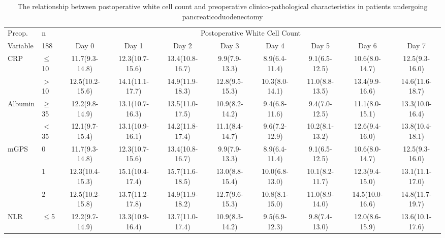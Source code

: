 \begin{sidewaystable}[p]
	\caption{The relationship  between postoperative white cell count and preoperative clinico-pathological characteristics in patients undergoing pancreaticoduodenectomy }
	\label{table:sirs_wcc}
	\footnotesize
	\centering
	\renewcommand{\arraystretch}{1.2} %
	\setlength{\tabcolsep}{5pt} %
	
	\begin{tabular}{|l l | cc cc cc cc|}
		\hline
		Preop.              & n         &                                            \multicolumn{8}{c|}{Postoperative White Cell Count}                                             \\
		Variable            & 188       & Day 0           &      Day 1      & Day 2           &     Day 3      & Day 4          &     Day 5      & Day 6           &      Day 7      \\ \hline
		CRP                 & $\leq$10  & 11.7(9.3-14.8)  & 12.3(10.7-15.6) & 13.4(10.8-16.7) & 9.9(7.9-13.3)  & 8.9(6.4-11.4)  & 9.1(6.5-12.5)  & 10.6(8.0-14.7)  & 12.5(9.3-16.0)  \\
		                    & $>$10     & 12.5(10.2-15.6) & 14.1(11.1-17.7) & 14.9(11.9-18.3) & 12.8(9.5-15.3) & 10.3(8.0-14.1) & 11.0(8.8-13.5) & 13.4(9.9-16.6)  & 14.6(11.6-18.7) \\
		Albumin             & $\geq$35  & 12.2(9.8-14.9)  & 13.1(10.7-16.3) & 13.5(11.0-17.5) & 10.9(8.2-14.2) & 9.4(6.8-11.6)  & 9.4(7.0-12.5)  & 11.1(8.0-15.1)  & 13.3(10.0-16.4) \\
		                    & $<$35     & 12.1(9.7-15.4)  & 13.1(10.9-16.1) & 14.2(11.8-17.4) & 11.1(8.4-14.7) & 9.6(7.2-12.9)  & 10.2(8.1-13.2) & 12.6(9.4-16.0)  & 13.8(10.4-18.1) \\
		mGPS                & 0         & 11.7(9.3-14.8)  & 12.3(10.7-15.6) & 13.4(10.8-16.7) & 9.9(7.9-13.3)  & 8.9(6.4-11.4)  & 9.1(6.5-12.5)  & 10.6(8.0-14.7)  & 12.5(9.3-16.0)  \\
		                    & 1         & 12.3(10.4-15.3) & 15.1(10.4-17.4) & 15.7(11.6-18.5) & 13.0(8.8-15.4) & 10.0(6.8-13.0) & 10.1(8.2-11.7) & 12.3(9.4-15.0)  & 13.1(11.1-17.0) \\
		                    & 2         & 12.5(10.2-15.8) & 13.7(11.2-17.8) & 14.9(11.9-18.2) & 12.7(9.6-15.3) & 10.8(8.1-15.0) & 11.0(8.9-14.0) & 14.5(10.0-16.6) & 14.8(11.7-19.7) \\
		NLR                 & $\leq$5   & 12.2(9.7-14.9)  & 13.3(10.9-16.4) & 13.7(11.0-17.4) & 10.9(8.3-14.2) & 9.5(6.9-12.3)  & 9.8(7.4-13.0)  & 12.0(8.6-15.9)  & 13.6(10.1-17.6) \\

\end{tabular}
\end{sidewaystable}
